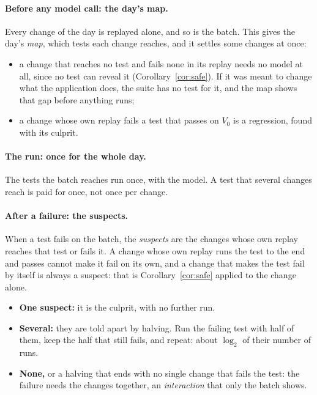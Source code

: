 \documentclass[11pt,a4paper]{article}
\begin{document}
\paragraph{Before any model call: the day's map.} Every change of the day is replayed alone, and so is the batch.
This gives the day's \emph{map}, which tests each change reaches, and it settles some changes at once:
\begin{itemize}
  \item a change that reaches no test and fails none in its replay needs no model at all, since no test can reveal
        it (Corollary~\ref{cor:safe}). If it was meant to change what the application does, the suite has no test
        for it, and the map shows that gap before anything runs;
  \item a change whose own replay fails a test that passes on $V_0$ is a regression, found with its culprit.
\end{itemize}

\paragraph{The run: once for the whole day.} The tests the batch reaches run once, with the model. A test that
several changes reach is paid for once, not once per change.

\paragraph{After a failure: the suspects.} When a test fails on the batch, the \emph{suspects} are the changes
whose own replay reaches that test or fails it. A change whose own replay runs the test to the end and passes
cannot make it fail on its own, and a change that makes the test fail by itself is always a suspect: that is
Corollary~\ref{cor:safe} applied to the change alone.
\begin{itemize}
  \item \textbf{One suspect:} it is the culprit, with no further run.
  \item \textbf{Several:} they are told apart by halving. Run the failing test with half of them, keep the half
        that still fails, and repeat: about $\log_2$ of their number of runs.
  \item \textbf{None,} or a halving that ends with no single change that fails the test: the failure needs the
        changes together, an \emph{interaction} that only the batch shows.
\end{itemize}
\end{document}
